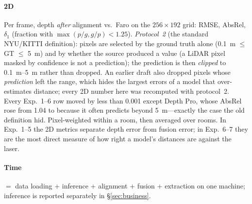 \paragraph{2D} Per frame, depth \emph{after} alignment vs.\ Faro  on the $256\times192$ grid:
RMSE, AbsRel, $\delta_1$ (fraction with $\max(p/g, g/p) < 1.25$). \emph{Protocol~2} (the standard NYU/KITTI
definition): pixels are selected by the ground truth alone (\SI{0.1}{m} $\leq$ GT $\leq$ \SI{5}{m}) and by whether the
source produced a value (a LiDAR pixel masked by confidence is not a prediction); the prediction is then
\emph{clipped} to \SIrange{0.1}{5}{m} rather than dropped. An earlier draft also dropped pixels whose \emph{prediction}
left the range, which hides the largest errors of a model that over-estimates distance; every 2D number here was
recomputed with protocol~2. Every Exp.~1--6 row moved by less than 0.001 except Depth Pro, whose AbsRel rose from
1.04 to \rsDEPTHPROABSREL{} because it often predicts beyond \SI{5}{m}---exactly the case the old definition hid. Pixel-weighted within a room, then averaged over rooms. In Exp.~1--5 the 2D metrics
separate depth error from fusion error; in Exp.~6--7 they are the most direct measure of how right a model's distances
are against the laser.
\paragraph{Time}  $=$ data loading $+$ inference $+$ alignment $+$ fusion $+$ extraction on one
machine; inference is reported separately in \S\ref{sec:business}.

